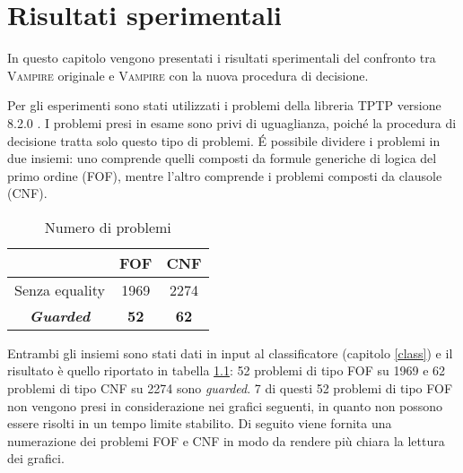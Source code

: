\chapter{Risultati sperimentali}
In questo capitolo vengono presentati i risultati sperimentali del confronto 
tra \textsc{Vampire} originale e \textsc{Vampire} con la nuova procedura di decisione.

Per gli esperimenti sono stati utilizzati i problemi della libreria TPTP versione 8.2.0 \cite{Sut17}.
I problemi presi in esame sono privi di uguaglianza, poiché la procedura di decisione tratta 
solo questo tipo di problemi. 
\'E possibile dividere i problemi in due insiemi:
uno comprende quelli composti da formule generiche di logica del primo ordine (FOF), mentre l'altro 
comprende i problemi composti da clausole (CNF).
\begin{table}[H]
    \begin{center}
    \caption{Numero di problemi}
    \begin{tabular}{ccc}
        \toprule %
        &\textbf{FOF} & \textbf{CNF}\\
        \midrule %
        Senza equality & 1969 & 2274\\
        \bottomrule %
        \textbf{\emph{Guarded}} & \textbf{52} & \textbf{62}\\
    \end{tabular}
    \label{tab:prob}
\end{center}
\end{table} 
Entrambi gli insiemi sono stati dati in input 
al classificatore (capitolo \ref{class}) e il risultato è quello riportato in tabella \ref{tab:prob}:
52 problemi di tipo FOF su 1969 e 62 problemi di tipo CNF su 2274 sono \emph{guarded}.
7 di questi 52 problemi di tipo FOF non vengono presi in considerazione nei grafici seguenti, in quanto 
non possono essere risolti in un tempo limite stabilito. Di seguito viene fornita una numerazione 
dei problemi FOF e CNF in modo da rendere più chiara la lettura dei grafici.
\noindent\begin{table}[H]
    \caption{Numerazione dei problemi FOF}
        
\end{table}
